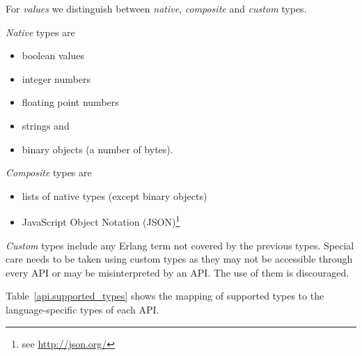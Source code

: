 \documentclass[a4paper]{scrreprt}
\begin{document}
For \emph{values} we distinguish between \emph{native}, \emph{composite}
and \emph{custom} types.

\emph{Native} types are
\begin{itemize}
  \item boolean values
  \item integer numbers
  \item floating point numbers
  \item strings and
  \item binary objects (a number of bytes).
\end{itemize}

\emph{Composite} types are
\begin{itemize}
  \item lists of native types (except binary objects)
  \item JavaScript Object Notation (JSON)\footnote{see \url{http://json.org/}}
\end{itemize}

\emph{Custom} types include any Erlang term not covered by the previous types.
Special care needs to be taken using custom types as they may not be accessible
through every API or may be misinterpreted by an API. The use of them is
discouraged.

Table~\ref{api.supported_types} shows the mapping of supported types to the
language-specific types of each API.
\end{document}
